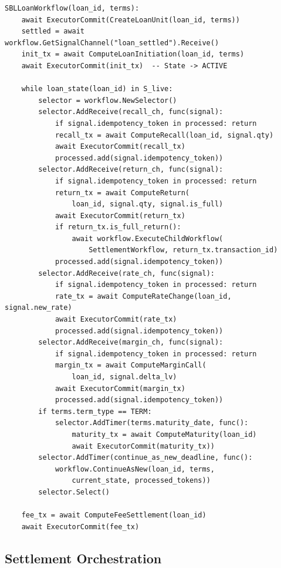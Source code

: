 \documentclass[11pt,a4paper]{article}
\begin{document}
\begin{lstlisting}
SBLLoanWorkflow(loan_id, terms):
    await ExecutorCommit(CreateLoanUnit(loan_id, terms))
    settled = await workflow.GetSignalChannel("loan_settled").Receive()
    init_tx = await ComputeLoanInitiation(loan_id, terms)
    await ExecutorCommit(init_tx)  -- State -> ACTIVE

    while loan_state(loan_id) in S_live:
        selector = workflow.NewSelector()
        selector.AddReceive(recall_ch, func(signal):
            if signal.idempotency_token in processed: return
            recall_tx = await ComputeRecall(loan_id, signal.qty)
            await ExecutorCommit(recall_tx)
            processed.add(signal.idempotency_token))
        selector.AddReceive(return_ch, func(signal):
            if signal.idempotency_token in processed: return
            return_tx = await ComputeReturn(
                loan_id, signal.qty, signal.is_full)
            await ExecutorCommit(return_tx)
            if return_tx.is_full_return():
                await workflow.ExecuteChildWorkflow(
                    SettlementWorkflow, return_tx.transaction_id)
            processed.add(signal.idempotency_token))
        selector.AddReceive(rate_ch, func(signal):
            if signal.idempotency_token in processed: return
            rate_tx = await ComputeRateChange(loan_id, signal.new_rate)
            await ExecutorCommit(rate_tx)
            processed.add(signal.idempotency_token))
        selector.AddReceive(margin_ch, func(signal):
            if signal.idempotency_token in processed: return
            margin_tx = await ComputeMarginCall(
                loan_id, signal.delta_lv)
            await ExecutorCommit(margin_tx)
            processed.add(signal.idempotency_token))
        if terms.term_type == TERM:
            selector.AddTimer(terms.maturity_date, func():
                maturity_tx = await ComputeMaturity(loan_id)
                await ExecutorCommit(maturity_tx))
        selector.AddTimer(continue_as_new_deadline, func():
            workflow.ContinueAsNew(loan_id, terms,
                current_state, processed_tokens))
        selector.Select()

    fee_tx = await ComputeFeeSettlement(loan_id)
    await ExecutorCommit(fee_tx)
\end{lstlisting}

\subsection{Settlement Orchestration}
\label{sec:settlement-workflow}
\end{document}
